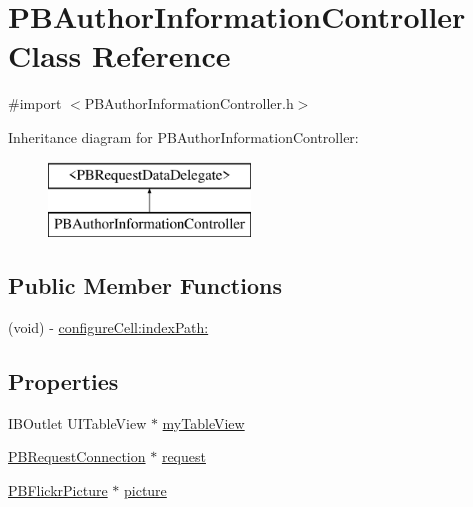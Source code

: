 \hypertarget{interface_p_b_author_information_controller}{
\section{PBAuthorInformationController Class Reference}
\label{interface_p_b_author_information_controller}
}


{\ttfamily \#import $<$PBAuthorInformationController.h$>$}

Inheritance diagram for PBAuthorInformationController:\begin{figure}[H]
\begin{center}
\leavevmode
\includegraphics[height=2cm]{interface_p_b_author_information_controller}
\end{center}
\end{figure}
\subsection*{Public Member Functions}
\begin{DoxyCompactItemize}
\item 
(void) -\/ \hyperlink{interface_p_b_author_information_controller_ab0dfca890b7574857d5c4eac485a3f97}{configureCell:indexPath:}
\end{DoxyCompactItemize}
\subsection*{Properties}
\begin{DoxyCompactItemize}
\item 
IBOutlet UITableView $\ast$ \hyperlink{interface_p_b_author_information_controller_add75b66dc13236a5c90f3f936f36d191}{myTableView}
\item 
\hyperlink{interface_p_b_request_connection}{PBRequestConnection} $\ast$ \hyperlink{interface_p_b_author_information_controller_a8fce7f9a4125c781da4f57a036811156}{request}
\item 
\hyperlink{interface_p_b_flickr_picture}{PBFlickrPicture} $\ast$ \hyperlink{interface_p_b_author_information_controller_a8e8f1764e92824eb69d5aa60ab1c2c77}{picture}
\end{DoxyCompactItemize}


